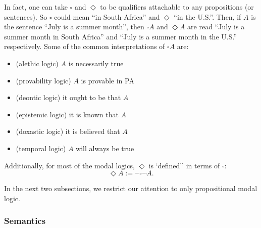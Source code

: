 \documentclass[12pt]{article}
\begin{document}
In fact, one can take $\square$ and $\Diamond$ to be qualifiers attachable to any propositions (or sentences).  So $\square$ could mean ``in South Africa'' and $\Diamond$ ``in the U.S.''.  Then, if $A$ is the sentence ``July is a summer month'', then $\square A$ and $\Diamond A$ are read ``July is a summer month in South Africa'' and ``July is a summer month in the U.S.'' respectively.  Some of the common interpretations of $\square A$ are:
\begin{multicols}{2}{
\begin{itemize}
\item (alethic logic) $A$ is necessarily true
\item (provability logic) $A$ is provable in PA
\item (deontic logic) it ought to be that $A$
\item (epistemic logic) it is known that $A$
\item (doxastic logic) it is believed that $A$
\item (temporal logic) $A$ will always be true
\end{itemize}
}\end{multicols}
Additionally, for most of the modal logics, $\Diamond$ is `defined'' in terms of $\square$: 
\begin{equation}
\Diamond A:=\neg \square \neg A.
\end{equation}

In the next two subsections, we restrict our attention to only propositional modal logic.

\subsubsection*{Semantics}
\end{document}
